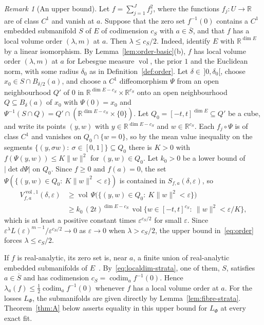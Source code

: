\documentclass[11pt,a4paper]{article}
\theoremstyle{definition}
\theoremstyle{remark}
\newtheorem{remark}[theorem]{Remark}
\numberwithin{equation}{section}
\newcommand{\R}{\mathbb{R}}
\newcommand{\codim}{\operatorname{codim}}
\newcommand{\vol}{\operatorname{vol}}
\newcommand{\norm}[1]{\lVert #1\rVert}
\newcommand{\abs}[1]{\lvert #1\rvert}
\newcommand{\eps}{\varepsilon}
\begin{document}
\begin{remark}[An upper bound]\label{rem:upper}
Let $f=\sum_{j=1}^Jf_j^2$, where the functions $f_j:U\to\R$ are of class $C^1$ and vanish at $a$. Suppose that the zero set $f^{-1}(0)$ contains a $C^1$ embedded submanifold $S$ of $E$ of codimension $c_S$ with $a\in\overline S$, and that $f$ has a local volume order $(\lambda,m)$ at $a$. Then $\lambda\le c_S/2$. Indeed, identify $E$ with $\R^{\dim E}$ by a linear isomorphism. By Lemma~\ref{lem:order-basic}(b), $f$ has local volume order $(\lambda,m)$ at $a$ for Lebesgue measure $\vol$, the prior $1$ and the Euclidean norm, with some radius $\delta_0$ as in Definition~\ref{def:order}. Let $\delta\in\,]0,\delta_0[$, choose $x_0\in S\cap B_{\delta/2}(a)$, and choose a $C^1$ diffeomorphism $\Psi$ from an open neighbourhood $Q'$ of $0$ in $\R^{\dim E-c_S}\times\R^{c_S}$ onto an open neighbourhood $Q\subseteq B_\delta(a)$ of $x_0$ with $\Psi(0)=x_0$ and $\Psi^{-1}(S\cap Q)=Q'\cap(\R^{\dim E-c_S}\times\{0\})$. Let $Q_0=[-t,t]^{\dim E}\subseteq Q'$ be a cube, and write its points $(y,w)$ with $y\in\R^{\dim E-c_S}$ and $w\in\R^{c_S}$. Each $f_j\circ\Psi$ is of class $C^1$ and vanishes on $Q_0\cap\{w=0\}$, so by the mean value inequality on the segments $\{(y,\sigma w):\ \sigma\in[0,1]\}\subseteq Q_0$ there is $K>0$ with $f(\Psi(y,w))\le K\norm w^2$ for $(y,w)\in Q_0$. Let $k_0>0$ be a lower bound of $\abs{\det d\Psi}$ on $Q_0$. Since $f\ge0$ and $f(a)=0$, the set $\Psi(\{(y,w)\in Q_0:\ K\norm w^2<\eps\})$ is contained in $S_{f,a}(\delta,\eps)$, so
\begin{align*}
V^{\vol,1}_{f,a}(\delta,\eps)&\ge\vol\,\Psi\bigl(\{(y,w)\in Q_0:\ K\norm w^2<\eps\}\bigr)\\
&\ge k_0\,(2t)^{\dim E-c_S}\,\vol\{w\in[-t,t]^{c_S}:\ \norm w^2<\eps/K\},
\end{align*}
which is at least a positive constant times $\eps^{c_S/2}$ for small $\eps$. Since $\eps^\lambda L(\eps)^{m-1}/\eps^{c_S/2}\to0$ as $\eps\to0$ when $\lambda>c_S/2$, the upper bound in~\eqref{eq:order} forces $\lambda\le c_S/2$.

If $f$ is real-analytic, its zero set is, near $a$, a finite union of real-analytic embedded submanifolds of $E$~\cite{bierstone-milman}. By~\eqref{eq:localdim-strata}, one of them, $S$, satisfies $a\in\overline S$ and has codimension $c_S=\codim_af^{-1}(0)$. Hence $\lambda_a(f)\le\frac{1}{2}\codim_af^{-1}(0)$ whenever $f$ has a local volume order at $a$. For the losses $L_\Phi$, the submanifolds are given directly by Lemma~\ref{lem:fibre-strata}. Theorem~\ref{thm:A} below asserts equality in this upper bound for $L_\Phi$ at every exact fit.
\end{remark}
\end{document}
